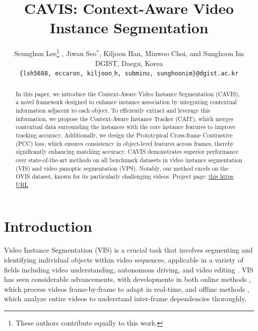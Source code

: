\documentclass[10pt,twocolumn,letterpaper]{article}
\title{CAVIS: Context-Aware Video Instance Segmentation}
\author{%
Seunghun Lee\thanks{These authors contribute equally to this work.} , Jiwan Seo$^*$, Kiljoon Han, Minwoo Choi, and Sunghoon Im  \\
DGIST, Daegu, Korea\\
\small\texttt{\{lsh5688, eccaron, kiljoon$\_$h, subminu, sunghoonim\}@dgist.ac.kr} \\
}
\begin{document}
\maketitle


\begin{abstract}
In this paper, we introduce the Context-Aware Video Instance Segmentation (CAVIS), a novel framework designed to enhance instance association by integrating contextual information adjacent to each object. To efficiently extract and leverage this information, we propose the Context-Aware Instance Tracker (CAIT), which merges contextual data surrounding the instances with the core instance features to improve tracking accuracy. Additionally, we design the Prototypical Cross-frame Contrastive (PCC) loss, which ensures consistency in object-level features across frames, thereby significantly enhancing matching accuracy. CAVIS demonstrates superior performance over state-of-the-art methods on all benchmark datasets in video instance segmentation (VIS) and video panoptic segmentation (VPS). Notably, our method excels on the OVIS dataset, known for its particularly challenging videos. Project page: \href{https://seung-hun-lee.github.io/projects/CAVIS/}{this https URL}
\end{abstract}


\section{Introduction}


Video Instance Segmentation (VIS) is a crucial task that involves segmenting and identifying individual objects within video sequences, applicable in a variety of fields including video understanding, autonomous driving, and video editing \citep{yang2019video}.
VIS has seen considerable advancements, with developments in both online methods \citep{yang2019video, cao2020sipmask, yang2021crossover, huang2022minvis, wu2022defense, ying2023ctvis, kim2024offline}, which process videos frame-by-frame to adapt in real-time, and offline methods \citep{wang2021end, hwang2021video, wu2022seqformer, cheng2021mask2former, heo2022vita}, which analyze entire videos to understand inter-frame dependencies thoroughly.

\end{document}
